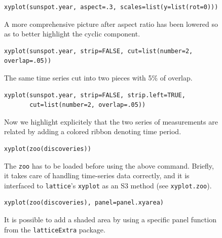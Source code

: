\documentclass[a4paper,twoside]{book}
\newcounter{fig}
\newcommand{\img}[1]{\texttt{[image: \#1]}\stepcounter{fig}}
\renewcommand{\texttt}[1]{\lstinline{#1}}
\begin{document}
\begin{figure}[H]
\begin{lstlisting}
xyplot(sunspot.year, aspect=.3, scales=list(y=list(rot=0)))
\end{lstlisting}
  \fcapside[\FBwidth] {\img{figs_lattice-crop}} {\caption*{A more
      comprehensive picture after aspect ratio has been lowered so as
      to better highlight the cyclic component.}}
\end{figure}

\begin{figure}[H]
\begin{lstlisting}
xyplot(sunspot.year, strip=FALSE, cut=list(number=2, overlap=.05))
\end{lstlisting}
  \fcapside[\FBwidth] {\img{figs_lattice-crop}}
  {\caption*{The same time series cut into two pieces with 5\% of overlap.}}
\end{figure}

\begin{figure}[H]
\begin{lstlisting}
xyplot(sunspot.year, strip=FALSE, strip.left=TRUE, 
       cut=list(number=2, overlap=.05))
\end{lstlisting}
  \fcapside[\FBwidth] {\img{figs_lattice-crop}}
  {\caption*{Now we highlight explicitely that the two series of
      measurements are related by adding a colored ribbon denoting
      time period.}}
\end{figure}

\begin{figure}[H]
\begin{lstlisting}
xyplot(zoo(discoveries))
\end{lstlisting}
  \fcapside[\FBwidth] {\img{figs_lattice-crop}}
  {\caption*{ The \texttt{zoo} has to be loaded before using the
      above command. Briefly, it takes care of handling time-series
      data correctly, and it is interfaced to \texttt{lattice}'s
      \texttt{xyplot} as an S3 method (see \texttt{xyplot.zoo}).}}
\end{figure}


\begin{figure}[H]
\begin{lstlisting}
xyplot(zoo(discoveries), panel=panel.xyarea)
\end{lstlisting}
  \fcapside[\FBwidth] {\img{figs_lattice-crop}}
  {\caption*{It is possible to add a shaded area by using a specific
      panel function from the \texttt{latticeExtra} package.}}
\end{figure}
\end{document}
